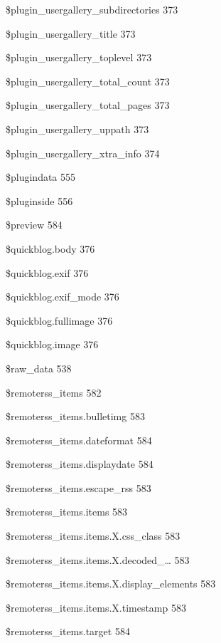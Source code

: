 \documentclass{book}
\renewcommand\subitem{\par}
\begin{document}
\begin{multicols}{2}
\begin{osp-index}
    \subitem \$plugin\_usergallery\_subdirectories\hspace{1mm} 373
    \subitem \$plugin\_usergallery\_title\hspace{1mm} 373
    \subitem \$plugin\_usergallery\_toplevel\hspace{1mm} 373
    \subitem \$plugin\_usergallery\_total\_count\hspace{1mm} 373
    \subitem \$plugin\_usergallery\_total\_pages\hspace{1mm} 373
    \subitem \$plugin\_usergallery\_uppath\hspace{1mm} 373
    \subitem \$plugin\_usergallery\_xtra\_info\hspace{1mm} 374
    \subitem \$plugindata\hspace{1mm} 555
    \subitem \$pluginside\hspace{1mm} 556
    \subitem \$preview\hspace{1mm} 584
    \subitem \$quickblog.body\hspace{1mm} 376
    \subitem \$quickblog.exif\hspace{1mm} 376
    \subitem \$quickblog.exif\_mode\hspace{1mm} 376
    \subitem \$quickblog.fullimage\hspace{1mm} 376
    \subitem \$quickblog.image\hspace{1mm} 376
    \subitem \$raw\_data\hspace{1mm} 538
    \subitem \$remoterss\_items\hspace{1mm} 582
    \subitem \$remoterss\_items.bulletimg\hspace{1mm} 583
    \subitem \$remoterss\_items.dateformat\hspace{1mm} 584
    \subitem \$remoterss\_items.displaydate\hspace{1mm} 584
    \subitem \$remoterss\_items.escape\_rss\hspace{1mm} 583
    \subitem \$remoterss\_items.items\hspace{1mm} 583
    \subitem \$remoterss\_items.items.X.css\_class\hspace{1mm} 583
    \subitem \$remoterss\_items.items.X.decoded\_\dots  \hspace{1mm} 
		583
    \subitem \$remoterss\_items.items.X.display\_elements\hspace{1mm} 
		583
    \subitem \$remoterss\_items.items.X.timestamp\hspace{1mm} 583
    \subitem \$remoterss\_items.target\hspace{1mm} 584

\end{osp-index}
\end{multicols}
\end{document}
